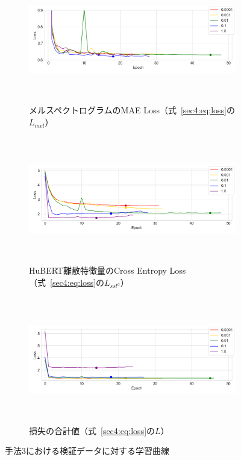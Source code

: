 \documentclass[12pt]{jarticle}
\numberwithin{equation}{section}    %
\numberwithin{figure}{section}      %
\numberwithin{table}{section}      %
\begin{document}
\begin{figure}[bt]
    \centering
    \begin{subfigure}{\linewidth}
        \centering
        \includegraphics[height=55mm]{./figure/sec4/learning_curve/impact_of_loss_weights_across_methods/3/mel_loss.png}
        \caption{メルスペクトログラムのMAE Loss（式~\eqref{sec4:eq:loss}の$L_{mel}$）}
        \label{sec4:fig:learning_curve_method_3_val_mel_loss}
    \end{subfigure}
    \begin{subfigure}{\linewidth}
        \centering
        \includegraphics[height=55mm]{./figure/sec4/learning_curve/impact_of_loss_weights_across_methods/3/ssl_feature_cluster_loss.png}
        \caption{HuBERT離散特徴量のCross Entropy Loss（式~\eqref{sec4:eq:loss}の$L_{ssl^{d}}$）}
        \label{sec4:fig:learning_curve_method_3_val_ssl_feature_cluster_loss}
    \end{subfigure}
    \begin{subfigure}{\linewidth}
        \centering
        \includegraphics[height=55mm]{./figure/sec4/learning_curve/impact_of_loss_weights_across_methods/3/total_loss.png}
        \caption{損失の合計値（式~\eqref{sec4:eq:loss}の$L$）}
        \label{sec4:fig:learning_curve_method_3_val_total_loss}
    \end{subfigure}
    \caption{手法3における検証データに対する学習曲線}
    \label{sec4:fig:learning_curve_method_3_val_losses}
\end{figure}
\end{document}
